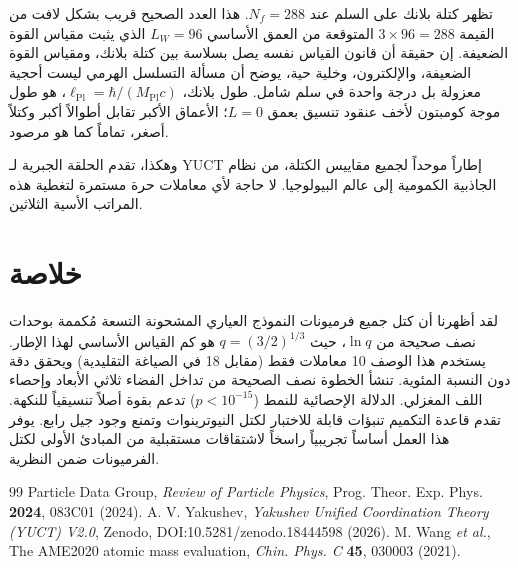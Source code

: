 \documentclass[12pt,a4paper]{article}
\begin{document}
	تظهر كتلة بلانك على السلم عند \(N_f = 288\). هذا العدد الصحيح قريب بشكل لافت من القيمة \(3 \times 96 = 288\) المتوقعة من العمق الأساسي \(L_W = 96\) الذي يثبت مقياس القوة الضعيفة. إن حقيقة أن قانون القياس نفسه يصل بسلاسة بين كتلة بلانك، ومقياس القوة الضعيفة، والإلكترون، وخلية حية، يوضح أن مسألة التسلسل الهرمي ليست أحجية معزولة بل درجة واحدة في سلم شامل. طول بلانك، \(\ell_{\mathrm{Pl}} = \hbar / (M_{\mathrm{Pl}} c)\)، هو طول موجة كومبتون لأخف عنقود تنسيق بعمق \(L=0\)؛ الأعماق الأكبر تقابل أطوالاً أكبر وكتلاً أصغر، تماماً كما هو مرصود.
	
	وهكذا، تقدم الحلقة الجبرية لـ YUCT إطاراً موحداً لجميع مقاييس الكتلة، من نظام الجاذبية الكمومية إلى عالم البيولوجيا. لا حاجة لأي معاملات حرة مستمرة لتغطية هذه المراتب الأسية الثلاثين.
	
	\section{خلاصة}
	لقد أظهرنا أن كتل جميع فرميونات النموذج العياري المشحونة التسعة مُكممة بوحدات نصف صحيحة من \(\ln q\)، حيث \(q = (3/2)^{1/3}\) هو كم القياس الأساسي لهذا الإطار. يستخدم هذا الوصف 10 معاملات فقط (مقابل 18 في الصياغة التقليدية) ويحقق دقة دون النسبة المئوية. تنشأ الخطوة نصف الصحيحة من تداخل الفضاء ثلاثي الأبعاد وإحصاء اللف المغزلي. الدلالة الإحصائية للنمط (\(p < 10^{-15}\)) تدعم بقوة أصلاً تنسيقياً للنكهة. تقدم قاعدة التكميم تنبؤات قابلة للاختبار لكتل النيوترينوات وتمنع وجود جيل رابع. يوفر هذا العمل أساساً تجريبياً راسخاً لاشتقاقات مستقبلية من المبادئ الأولى لكتل الفرميونات ضمن النظرية.
	
	\begin{thebibliography}{99}
		 Particle Data Group, \textit{Review of Particle Physics}, Prog. Theor. Exp. Phys. \textbf{2024}, 083C01 (2024).
		 A. V. Yakushev, \textit{Yakushev Unified Coordination Theory (YUCT) V2.0}, Zenodo, DOI:10.5281/zenodo.18444598 (2026).
		 M. Wang \textit{et al.}, The AME2020 atomic mass evaluation, \textit{Chin. Phys. C} \textbf{45}, 030003 (2021).
	\end{thebibliography}
	
\end{document}
